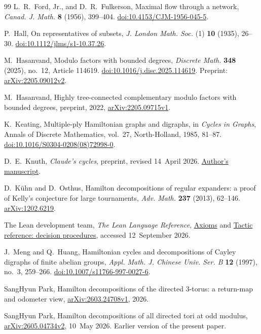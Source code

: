\documentclass[11pt,reqno]{amsart}
\numberwithin{equation}{section}
\theoremstyle{definition}
\theoremstyle{remark}
\newcommand{\arxivref}[1]{\href{https://arxiv.org/abs/#1}{arXiv:#1}}
\newcommand{\doiref}[1]{\href{https://doi.org/#1}{doi:#1}}
\begin{document}
\begin{thebibliography}{99}
L.~R.~Ford, Jr., and D.~R.~Fulkerson,
Maximal flow through a network,
\emph{Canad. J. Math.} \textbf{8} (1956), 399--404.
\doiref{10.4153/CJM-1956-045-5}.

P.~Hall,
On representatives of subsets,
\emph{J. London Math. Soc.} (1) \textbf{10} (1935), 26--30.
\doiref{10.1112/jlms/s1-10.37.26}.

M.~Hasanvand,
Modulo factors with bounded degrees,
\emph{Discrete Math.} \textbf{348} (2025), no.~12, Article 114619.
\doiref{10.1016/j.disc.2025.114619}.
Preprint: \arxivref{2205.09012v2}.

M.~Hasanvand,
Highly tree-connected complementary modulo factors with bounded degrees,
preprint, 2022, \arxivref{2205.09715v1}.

K.~Keating,
Multiple-ply Hamiltonian graphs and digraphs,
in \emph{Cycles in Graphs}, Annals of Discrete Mathematics, vol.~27,
North-Holland, 1985, 81--87.
\doiref{10.1016/S0304-0208(08)72998-0}.

D.~E.~Knuth,
\emph{Claude's cycles}, preprint, revised 14~April 2026.
\href{https://www-cs-faculty.stanford.edu/~knuth/papers/claude-cycles.pdf}{Author's manuscript}.

D.~K\"uhn and D.~Osthus,
Hamilton decompositions of regular expanders: a proof of Kelly's conjecture for
large tournaments,
\emph{Adv. Math.} \textbf{237} (2013), 62--146.
\arxivref{1202.6219}.

The Lean development team,
\emph{The Lean Language Reference},
\href{https://lean-lang.org/doc/reference/latest/Axioms/}{Axioms} and
\href{https://lean-lang.org/doc/reference/latest/Tactic-Proofs/Tactic-Reference/}{Tactic reference: decision procedures},
accessed 12~September 2026.

J.~Meng and Q.~Huang,
Hamiltonian cycles and decompositions of Cayley digraphs of finite abelian groups,
\emph{Appl. Math. J. Chinese Univ. Ser. B} \textbf{12} (1997), no.~3, 259--266.
\doiref{10.1007/s11766-997-0027-6}.

SangHyun Park,
Hamilton decompositions of the directed $3$-torus: a return-map and odometer view,
\arxivref{2603.24708v1}, 2026.

SangHyun Park,
Hamilton decompositions of all directed tori at odd modulus,
\arxivref{2605.04734v2}, 10~May 2026.
Earlier version of the present paper.


\end{thebibliography}
\end{document}
